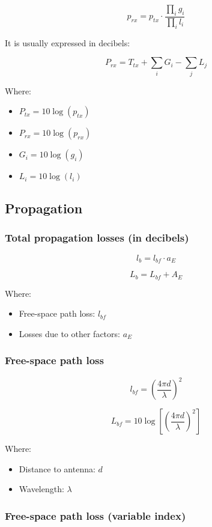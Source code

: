 \documentclass[
	12pt,
	twoside
]{book}
\begin{document}
$$
	p_{rx} = p_{tx} \cdot \frac {\prod_i g_i} {\prod_i l_i}
$$

It is usually expressed in decibels:

$$
	P_{rx} = T_{tx} + \sum_i G_i - \sum_j L_j
$$

Where:

\begin{itemize}
	\item $P_{tx} = 10 \log (p_{tx})$
	\item $P_{rx} = 10 \log (p_{rx})$
	\item $G_i = 10 \log (g_i)$
	\item $L_i = 10 \log (l_i)$
\end{itemize}

\subsection{Propagation}

\subsubsection{Total propagation losses (in decibels)}

$$
	l_b = l_{bf} \cdot a_E
$$

$$
	L_b = L_{bf} + A_E
$$

Where:

\begin{itemize}
	\item Free-space path loss: $l_{bf}$
	\item Losses due to other factors: $a_E$
\end{itemize}

\subsubsection{Free-space path loss}

$$
	l_{bf} = \left( \frac {4 \pi d} {\lambda} \right)^2
$$

$$
	L_{bf} = 10 \log \left[ \left( \frac {4 \pi d} {\lambda} \right)^2 \right]
$$

Where:

\begin{itemize}
	\item Distance to antenna: $d$
	\item Wavelength: $\lambda$
\end{itemize}

\subsubsection{Free-space path loss (variable index)}
\end{document}
